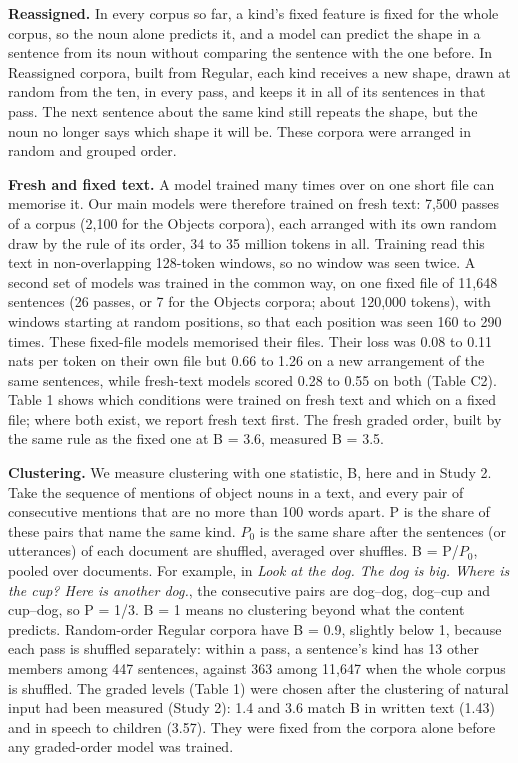 \textbf{Reassigned.} In every corpus so far, a kind's fixed feature is fixed for the whole corpus, so the noun alone predicts it, and a model can predict the shape in a sentence from its noun without comparing the sentence with the one before. In Reassigned corpora, built from Regular, each kind receives a new shape, drawn at random from the ten, in every pass, and keeps it in all of its sentences in that pass. The next sentence about the same kind still repeats the shape, but the noun no longer says which shape it will be. These corpora were arranged in random and grouped order.

\textbf{Fresh and fixed text.} A model trained many times over on one short file can memorise it. Our main models were therefore trained on fresh text: 7,500 passes of a corpus (2,100 for the Objects corpora), each arranged with its own random draw by the rule of its order, 34 to 35 million tokens in all. Training read this text in non-overlapping 128-token windows, so no window was seen twice. A second set of models was trained in the common way, on one fixed file of 11,648 sentences (26 passes, or 7 for the Objects corpora; about 120,000 tokens), with windows starting at random positions, so that each position was seen 160 to 290 times. These fixed-file models memorised their files. Their loss was 0.08 to 0.11 nats per token on their own file but 0.66 to 1.26 on a new arrangement of the same sentences, while fresh-text models scored 0.28 to 0.55 on both (Table C2). Table 1 shows which conditions were trained on fresh text and which on a fixed file; where both exist, we report fresh text first. The fresh graded order, built by the same rule as the fixed one at B = 3.6, measured B = 3.5.

\textbf{Clustering.} We measure clustering with one statistic, B, here and in Study 2. Take the sequence of mentions of object nouns in a text, and every pair of consecutive mentions that are no more than 100 words apart. P is the share of these pairs that name the same kind. $P_0$ is the same share after the sentences (or utterances) of each document are shuffled, averaged over shuffles. B = P/$P_0$, pooled over documents. For example, in \emph{Look at the dog. The dog is big. Where is the cup? Here is another dog.}, the consecutive pairs are dog--dog, dog--cup and cup--dog, so P = 1/3. B = 1 means no clustering beyond what the content predicts. Random-order Regular corpora have B = 0.9, slightly below 1, because each pass is shuffled separately: within a pass, a sentence's kind has 13 other members among 447 sentences, against 363 among 11,647 when the whole corpus is shuffled. The graded levels (Table 1) were chosen after the clustering of natural input had been measured (Study 2): 1.4 and 3.6 match B in written text (1.43) and in speech to children (3.57). They were fixed from the corpora alone before any graded-order model was trained.

